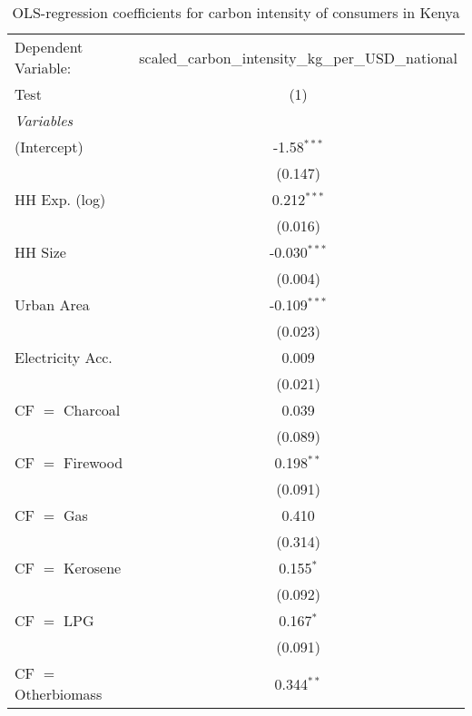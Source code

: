 
\begin{table}[htbp!]
   \centering
   \small
   \begin{adjustbox}{width = 1\textwidth, max height = 0.95\textheight, center}
      \begin{threeparttable}[b]
         \caption{\label{tab:OLS_1_KEN} OLS-regression coefficients for carbon intensity of consumers in Kenya}
         \begin{tabular}{lc}
            \tabularnewline \midrule \midrule
            Dependent Variable: & scaled\_carbon\_intensity\_kg\_per\_USD\_national\\        
            Test                & (1)\\  
            \midrule
            \emph{Variables}\\
            (Intercept)         & -1.58$^{***}$\\   
                                & (0.147)\\   
            HH Exp. (log)       & 0.212$^{***}$\\   
                                & (0.016)\\   
            HH Size             & -0.030$^{***}$\\   
                                & (0.004)\\   
            Urban Area          & -0.109$^{***}$\\   
                                & (0.023)\\   
            Electricity Acc.    & 0.009\\   
                                & (0.021)\\   
            CF $=$ Charcoal     & 0.039\\   
                                & (0.089)\\   
            CF $=$ Firewood     & 0.198$^{**}$\\   
                                & (0.091)\\   
            CF $=$ Gas          & 0.410\\   
                                & (0.314)\\   
            CF $=$ Kerosene     & 0.155$^{*}$\\   
                                & (0.092)\\   
            CF $=$ LPG          & 0.167$^{*}$\\   
                                & (0.091)\\   
            CF $=$ Otherbiomass & 0.344$^{**}$\\   

\end{tabular}
\end{threeparttable}
\end{adjustbox}
\end{table}
